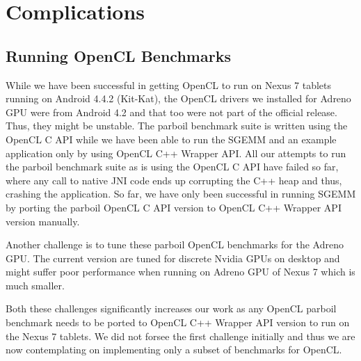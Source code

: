 \section*{Complications}
\subsection*{Running OpenCL Benchmarks}
While we have been successful in getting OpenCL to run on Nexus 7 tablets
running on Android 4.4.2 (Kit-Kat), the OpenCL drivers we installed for Adreno
GPU were from
Android 4.2 and that too were not part of the official release. Thus, they might
be unstable. The parboil benchmark suite is written using the OpenCL C API while
we have been able to run the SGEMM and an example application only by using
OpenCL C++ Wrapper API. All our attempts to run the parboil benchmark suite as
is using the OpenCL C API have failed so far, where any call to native JNI code
ends up corrupting the C++ heap and thus, crashing the application. So far, we
have only been successful in running SGEMM by porting the parboil OpenCL C
API version to OpenCL C++ Wrapper API version manually.

Another challenge is to tune these parboil OpenCL benchmarks for the Adreno GPU.
The current version are tuned for discrete Nvidia GPUs on desktop and might
suffer poor performance when running on Adreno GPU of Nexus 7 which is much
smaller.

Both these challenges significantly
increases our work as any OpenCL parboil benchmark needs to be ported to OpenCL
C++ Wrapper API version to run on the Nexus 7 tablets. We did not forsee the
first
challenge initially and thus we are now contemplating on implementing only a
subset of benchmarks for OpenCL.
